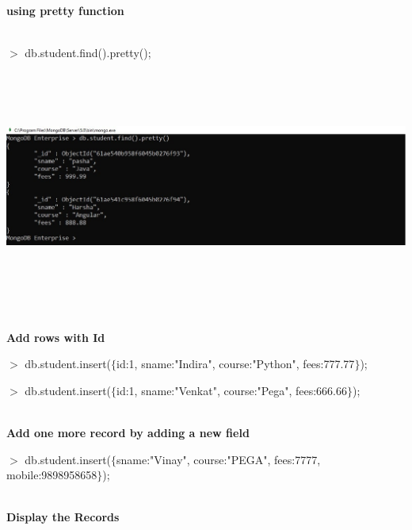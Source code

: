 \documentclass{article}
\begin{document}
\noindent 

\noindent 

\noindent 

\noindent 

\noindent 

\noindent 

\noindent 
\newpage
\noindent \\ \textbf{using pretty function}

\noindent \\ $\mathrm{>}$ db.student.find().pretty();

\noindent 

\noindent 

\begin{center}
	\noindent \includegraphics*[width=6.59in, height=2.99in]{IMG-04-05}
\end{center}

\noindent 

\noindent 

\noindent \\ \textbf{Add rows with Id}

\noindent  $\mathrm{>}$ db.student.insert($\mathrm{\{}$id:1, sname:"Indira", course:"Python", fees:777.77$\mathrm{\}}$);

\noindent $\mathrm{>}$ db.student.insert($\mathrm{\{}$id:1, sname:"Venkat", course:"Pega", fees:666.66$\mathrm{\}}$);

\noindent 

\noindent \\ \textbf{Add one more record by adding a new field}

\noindent  $\mathrm{>}$ db.student.insert($\mathrm{\{}$sname:"Vinay", course:"PEGA", fees:7777, mobile:9898958658$\mathrm{\}}$);

\noindent 
\newpage
\noindent \\ \textbf{Display the Records}
\end{document}
